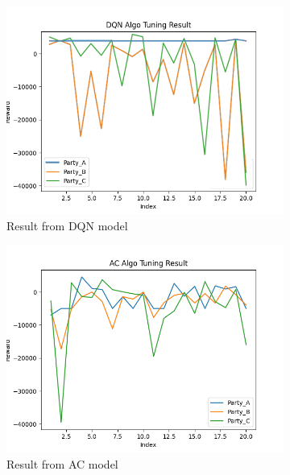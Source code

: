 \documentclass[11pt,twoside]{article}
\numberwithin{Theorem}{section}
\numberwithin{Definition}{section}
\numberwithin{Lemma}{section}
\numberwithin{Algorithm}{section}
\numberwithin{equation}{section}
\begin{document}
\begin{figure}[!ht]
\centering
\begin{subfigure}{0.45\textwidth}
    \includegraphics[width=\linewidth]{DQN.png}
    \caption{Result from DQN model}
    \label{fig:DQN}
\end{subfigure}
\begin{subfigure}{0.45\textwidth}
    \includegraphics[width=\linewidth]{AC.png}
    \caption{Result from AC model}
    \label{fig:AC}
\end{subfigure}
\begin{subfigure}{0.45\textwidth}

\end{subfigure}
\end{figure}
\end{document}
